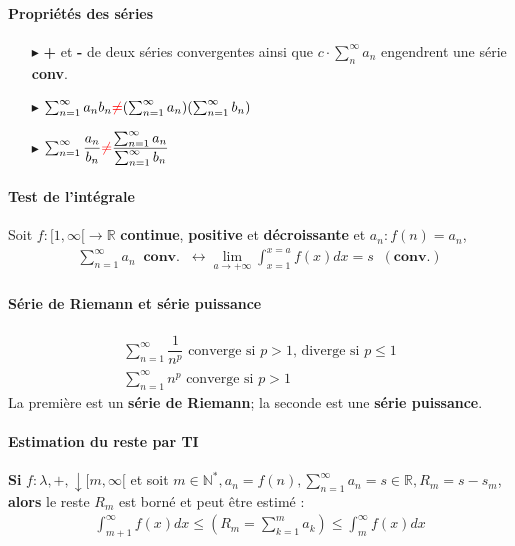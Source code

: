 \documentclass{report}
\begin{document}
\begin{multicols*}{3}
\begin{itemize}
    \end{itemize}



    \paragraph{Propriétés des séries}
    \begin{itemize}
        \item[$\blacktriangleright$]  \textbf{+} et \textbf{-} de deux séries convergentes 
            ainsi que $c \cdot \sum_{n}^{\infty }a_n$ engendrent une série \textbf{conv}.
        \item[$\blacktriangleright$] 
            $\sum_{n=1}^{\infty}a_nb_n \textcolor{red}{\neq} 
            (\sum_{n=1}^{\infty}a_n)(\sum_{n=1}^{\infty}b_n)$
        \item[$\blacktriangleright$]
            $\sum_{n=1}^{\infty }\dfrac{a_n}{b_n} 
            \textcolor{red}{\neq} 
            \dfrac{\sum_{n=1}^{\infty}a_n}{\sum_{n=1}^{\infty}b_n}$
    \end{itemize}
    
    
    \paragraph{Test de l'intégrale}
    Soit $f : [1, \infty [ \rightarrow \mathbb{R}$ 
    \textbf{continue}, \textbf{positive} et \textbf{décroissante} 
    et $a_n : f(n) = a_n$,
    \begin{align*}
        \sum_{n=1}^{\infty }a_n \;\; \textbf{conv.} \;\; \leftrightarrow
        \lim\limits_{a \to+\infty }\int_{x=1}^{x = a}f(x)dx = s \;\; (\textbf{conv.})    
    \end{align*}


    \paragraph{Série de Riemann et série puissance} 
    \begin{align*}
        \sum_{n=1}^{\infty }\dfrac{1}{n^p} 
        \text{ converge si } p > 1 \text{, diverge si } p \leq 1
        \\
        \sum_{n=1}^{\infty}n^p \text{ converge  si }
         p > 1 
    \end{align*}
    La première est un \textbf{série de Riemann}; la seconde 
    est une \textbf{série puissance}.  


    
    \paragraph{Estimation du reste par TI}
    \textbf{Si} $f: \lambda, + , \downarrow [m, \infty [$ et soit $m \in \mathbb{N}^*, 
     a_n = f(n), \sum_{n=1}^{\infty}a_n = s \in \mathbb{R}, 
     R_m = s - s_m$, \textbf{alors} le reste $R_m$ est borné et peut être 
     estimé :
     \begin{align*}
        \int_{m+1}^{\infty }f(x)dx \leq \left(R_m = \sum_{k=1}^{m} a_k\right) 
        \leq \int_{m}^{\infty }f(x)dx
     \end{align*}



\end{multicols*}
\end{document}
